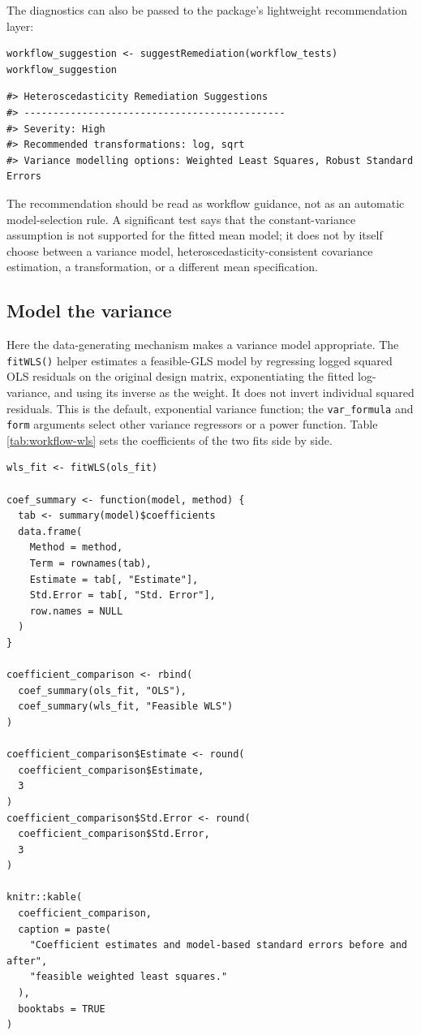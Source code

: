The diagnostics can also be passed to the package's lightweight recommendation
layer:

\begin{verbatim}
workflow_suggestion <- suggestRemediation(workflow_tests)
workflow_suggestion
\end{verbatim}

\begin{verbatim}
#> Heteroscedasticity Remediation Suggestions
#> ---------------------------------------------
#> Severity: High 
#> Recommended transformations: log, sqrt 
#> Variance modelling options: Weighted Least Squares, Robust Standard Errors
\end{verbatim}

The recommendation should be read as workflow guidance, not as an automatic
model-selection rule. A significant test says that the constant-variance
assumption is not supported for the fitted mean model; it does not by itself
choose between a variance model, heteroscedasticity-consistent covariance
estimation, a transformation, or a different mean specification.

\subsection{Model the variance}\label{model-the-variance}

Here the data-generating mechanism makes a variance model appropriate. The
\texttt{fitWLS()} helper estimates a feasible-GLS model by regressing logged squared
OLS residuals on the original design matrix, exponentiating the fitted
log-variance, and using its inverse as the weight. It does not invert individual
squared residuals. This is the default, exponential variance function; the
\texttt{var\_formula} and \texttt{form} arguments select other variance regressors or a power
function. Table \ref{tab:workflow-wls} sets the coefficients of the two fits
side by side.

\begin{verbatim}
wls_fit <- fitWLS(ols_fit)

coef_summary <- function(model, method) {
  tab <- summary(model)$coefficients
  data.frame(
    Method = method,
    Term = rownames(tab),
    Estimate = tab[, "Estimate"],
    Std.Error = tab[, "Std. Error"],
    row.names = NULL
  )
}

coefficient_comparison <- rbind(
  coef_summary(ols_fit, "OLS"),
  coef_summary(wls_fit, "Feasible WLS")
)

coefficient_comparison$Estimate <- round(
  coefficient_comparison$Estimate,
  3
)
coefficient_comparison$Std.Error <- round(
  coefficient_comparison$Std.Error,
  3
)

knitr::kable(
  coefficient_comparison,
  caption = paste(
    "Coefficient estimates and model-based standard errors before and after",
    "feasible weighted least squares."
  ),
  booktabs = TRUE
)
\end{verbatim}

